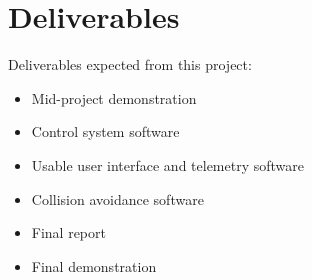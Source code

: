 \documentclass[titlepage 12pt]{article}
\begin{document}
{\section{Deliverables}  
Deliverables expected from this project: 
\begin{itemize}
	\item Mid-project demonstration
	\item Control system software
	\item Usable user interface and telemetry software
	\item Collision avoidance software
	\item Final report
	\item Final demonstration
\end{itemize}


    
\newpage
\raggedright
{}
\printbibliography[title={Annotated Bibliography}]
%


}
\end{document}
